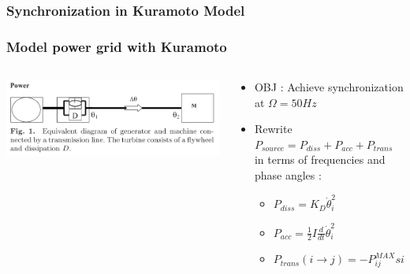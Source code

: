 \documentclass[xcolor=dvipsnames]{beamer}
\begin{document}
\begin{frame}
	\frametitle{Synchronization in Kuramoto Model}
	
\begin{center}
\end{center}

\end{frame}

\begin{frame}
	\frametitle{Model power grid with Kuramoto}
	
	\begin{small}
	\begin{columns}
		\begin{column}{.45\textwidth}
			\includegraphics[scale=.45]{line}
		\end{column}
		\begin{column}{.55\textwidth}
			\begin{itemize}
				\item OBJ : Achieve synchronization at $ \Omega = 50Hz $
				\item Rewrite $ P_{source} = P_{diss} + P_{acc} + P_{trans} $ in terms of frequencies and phase angles :
				\begin{itemize}
					\item $ P_{diss} = K_D \dot{\theta}_i^2	$
					\item $ P_{acc} = \frac{1}{2}I\frac{d}{dt}\dot{\theta}_i^2 $	
					\item $P_{trans}(i \rightarrow j) = -P_{ij}^{MAX} sin(\theta_j-\theta_i) $ 
				\end{itemize}
			\end{itemize}
		\end{column}
	\end{columns}
	\begin{itemize}

\end{itemize}
\end{small}
\end{frame}
\end{document}
